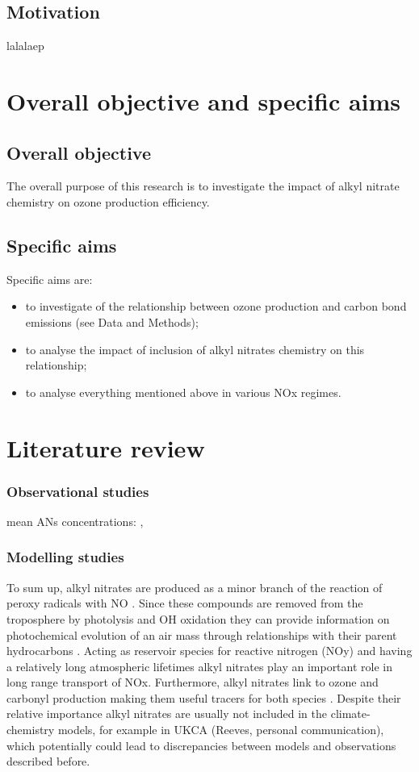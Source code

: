 \documentclass[11pt,a4paper]{article}
\begin{document}
\subsection{Motivation}
lalalaep

\section{Overall objective and specific aims}
\subsection{Overall objective}
The overall purpose of this research is to investigate the impact of alkyl nitrate chemistry on ozone production efficiency.
\subsection{Specific aims}
Specific aims are:
\begin{itemize}
\item to investigate of the relationship between ozone production and carbon bond emissions (see Data and Methods);
\item to analyse the impact of inclusion of alkyl nitrates chemistry on this relationship;
\item to analyse everything mentioned above in various NOx regimes.
\end{itemize}

\section{Literature review} \label{sec:data}
\subsubsection{Observational studies}

mean ANs concentrations: \citep{Reeves2007}, \citep{Roberts1998}

\subsubsection{Modelling studies}

To sum up, alkyl nitrates are produced as a minor branch of the reaction of peroxy radicals with NO \citep{Day2003}. Since these compounds are removed from the troposphere by photolysis and OH oxidation they can provide information on photochemical evolution of an air mass through relationships with their parent hydrocarbons \citep{Bertman1995}. Acting as reservoir species for reactive nitrogen (NOy) and having a relatively long atmospheric lifetimes alkyl nitrates play an important role in long range transport of NOx. Furthermore, alkyl nitrates link to ozone and carbonyl production making them useful tracers for both species \citep{Worton2010}. Despite their relative importance alkyl nitrates are usually not included in the climate-chemistry models, for example in UKCA (Reeves, personal communication), which potentially could lead to discrepancies between models and observations described before. 
\end{document}
